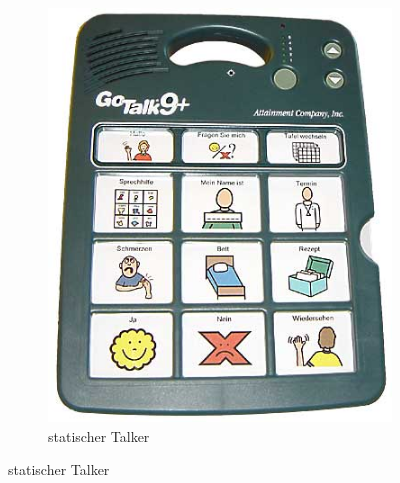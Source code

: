             \begin{figure}[H]
				\centering
				\begin{subfigure}{.33\textwidth}
  					\centering
  					\includegraphics[width=.8\linewidth]{images/goTalkPlus.jpg}
  					\caption{statischer Talker \parencite{rehavista:goTalkPlus}}
                    

\end{subfigure}
\end{figure}
